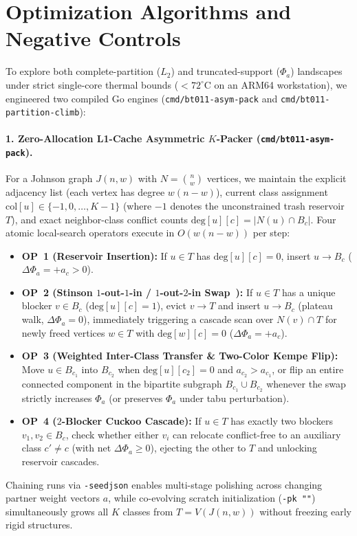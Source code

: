 \documentclass[11pt,letterpaper]{article}
\theoremstyle{plain}
\theoremstyle{definition}
\theoremstyle{remark}
\begin{document}
\TableNSixteenSpectra

\section{Optimization Algorithms and Negative Controls}
\label{sec:algo}

To explore both complete-partition ($L_2$) and truncated-support ($\Phi_a$) landscapes under strict single-core thermal bounds ($< 72^\circ\mathrm{C}$ on an ARM64 workstation), we engineered two compiled Go engines (\texttt{cmd/bt011-asym-pack} and \texttt{cmd/bt011-partition-climb}):

\paragraph{1. Zero-Allocation L1-Cache Asymmetric $K$-Packer (\texttt{cmd/bt011-asym-pack}).}
For a Johnson graph $J(n, w)$ with $N = \binom{n}{w}$ vertices, we maintain the explicit adjacency list (each vertex has degree $w(n-w)$), current class assignment $\mathrm{col}[u] \in \{-1, 0, \dots, K-1\}$ (where $-1$ denotes the unconstrained trash reservoir $T$), and exact neighbor-class conflict counts $\mathrm{deg}[u][c] = |N(u) \cap B_c|$. Four atomic local-search operators execute in $O(w(n-w))$ per step:
\begin{itemize}[leftmargin=1.5em,itemsep=1.5pt]
    \item \textbf{OP~1 (Reservoir Insertion):} If $u \in T$ has $\mathrm{deg}[u][c] = 0$, insert $u \to B_c$ ($\Delta \Phi_a = +a_c > 0$).
    \item \textbf{OP~2 (Stinson $1$-out-$1$-in / $1$-out-$2$-in Swap~\cite{Stinson1985}):} If $u \in T$ has a unique blocker $v \in B_c$ ($\mathrm{deg}[u][c] = 1$), evict $v \to T$ and insert $u \to B_c$ (plateau walk, $\Delta \Phi_a = 0$), immediately triggering a cascade scan over $N(v) \cap T$ for newly freed vertices $w \in T$ with $\mathrm{deg}[w][c] = 0$ ($\Delta \Phi_a = +a_c$).
    \item \textbf{OP~3 (Weighted Inter-Class Transfer \& Two-Color Kempe Flip):} Move $u \in B_{c_1}$ into $B_{c_2}$ when $\mathrm{deg}[u][c_2] = 0$ and $a_{c_2} > a_{c_1}$, or flip an entire connected component in the bipartite subgraph $B_{c_1} \cup B_{c_2}$ whenever the swap strictly increases $\Phi_a$ (or preserves $\Phi_a$ under tabu perturbation).
    \item \textbf{OP~4 ($2$-Blocker Cuckoo Cascade):} If $u \in T$ has exactly two blockers $v_1, v_2 \in B_c$, check whether either $v_i$ can relocate conflict-free to an auxiliary class $c' \neq c$ (with net $\Delta \Phi_a \ge 0$), ejecting the other to $T$ and unlocking reservoir cascades.
\end{itemize}
Chaining runs via \texttt{-seedjson} enables multi-stage polishing across changing partner weight vectors $a$, while co-evolving scratch initialization (\texttt{-pk ""}) simultaneously grows all $K$ classes from $T = V(J(n, w))$ without freezing early rigid structures.
\end{document}

